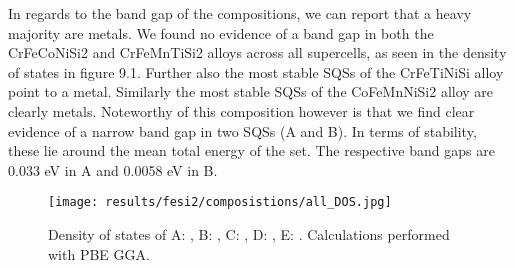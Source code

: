 In regards to the band gap of the compositions, we can report that a heavy majority are metals. We found no evidence of a band gap in both the CrFeCoNiSi2 and CrFeMnTiSi2 alloys across all supercells, as seen in the density of states in figure 9.1. Further also the most stable SQSs of the CrFeTiNiSi alloy point to a metal. Similarly the most stable SQSs of the CoFeMnNiSi2 alloy are clearly metals. Noteworthy of this composition however is that we find clear evidence of a narrow band gap in two SQSs (A and B). In terms of stability, these lie around the mean total energy of the set. The respective band gaps are 0.033 eV in A and 0.0058 eV in B.

\begin{figure}[H]
\hskip-5cm\texttt{[image: results/fesi2/composistions/all\_DOS.jpg]}
\caption{Density of states of A: , B: , C: , D: , E: . Calculations performed with PBE GGA.}
\end{figure}

